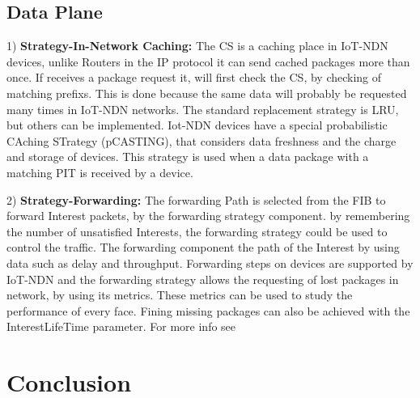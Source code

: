 \documentclass[conference]{IEEEtran}
\begin{document}
\subsection{Data Plane}
1) \textbf{Strategy-In-Network Caching:} 
The CS is a caching place in IoT-NDN devices, unlike Routers in the IP protocol it can send cached packages more than once.
If receives a package request it, will first check the CS, by checking of matching prefixs. %
This is done because the same data will probably be requested many times in IoT-NDN networks.
The standard replacement strategy is LRU, but others can be implemented. %
Iot-NDN devices have a special probabilistic CAching STrategy (pCASTING), that considers data freshness and the charge and storage of devices. This strategy is used %
when a data package with a matching PIT is received by a device.

2) \textbf{Strategy-Forwarding:}
The forwarding Path is selected from the FIB to forward Interest packets, by the forwarding strategy component. %
by remembering the number of unsatisfied Interests, the forwarding strategy could be used to control the traffic. %
The forwarding component the path of the Interest by using data such as delay and throughput. %
Forwarding steps on devices are supported by IoT-NDN and the forwarding strategy allows the requesting of lost packages in network, by using its metrics. %
These metrics can be used to study the performance of every face.
Fining missing packages can also be achieved with the InterestLifeTime parameter. For more info see \cite{b6}


\section{Conclusion}
\end{document}
